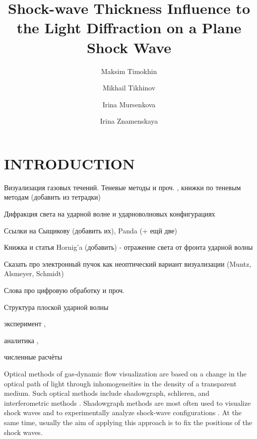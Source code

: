 \documentclass{aip-cp}
\begin{document}
\title{Shock-wave Thickness Influence to the Light Diffraction on a Plane Shock Wave}

\author[aff1,aff2]{Maksim Timokhin}
\author[aff1]{Mikhail Tikhinov}
\author[aff1]{Irina Mursenkova}
\author[aff1]{Irina Znamenskaya}


\maketitle


\begin{abstract}

\end{abstract}

\section{INTRODUCTION}

Визуализация газовых течений. Теневые методы и проч. , книжки по теневым методам (добавить из тетрадки)

Дифракция света на ударной волне и ударноволновых конфигурациях

Ссылки на Сыщикову (добавить их), Panda \cite{Panda_1995} (+ ещй две)

Книжка и статья Hornig'a (добавить) - отражение света от фронта ударной волны

Сказать про электронный пучок как неоптический вариант визуализации (Muntz, Alsmeyer, Schmidt) 

Слова про цифровую обработку и проч. 

Структура плоской ударной волны 

эксперимент \cite{Schmidt_1969, Alsmeyer_1976, Pham-Van-Diep624}, 

аналитика \cite{Becker_1922, Mott-Smith_1951, Salwen_1964}, 

численные расчёты \cite{Kogan, Dodulad_Tcheremissine_2013, Rykov2008, ShockWaves_2015, Struchtrup_Torrilhon_2004, overshoot_2015} 

Optical methods of gas-dynamic flow visualization are based on a change in the optical path of light through inhomogeneities in the density of a transparent medium. Such optical methods include shadowgraph, schlieren, and interferometric methods \cite{}. Shadowgraph methods are most often used to visualize shock waves and to experimentally analyze shock-wave configurations \cite{}. At the same time, usually the aim of applying this approach is to fix the positions of the shock waves. 
\end{document}
